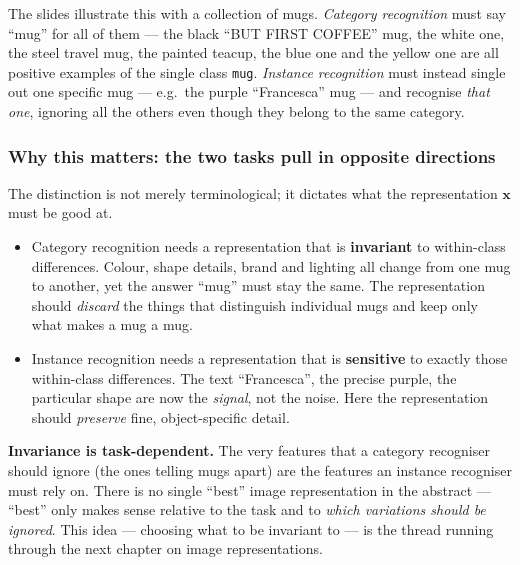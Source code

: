 \documentclass{report}
\newcommand{\xvec}{\mathbf{x}}
\begin{document}
The slides illustrate this with a collection of mugs. \emph{Category
recognition} must say ``mug'' for all of them --- the black ``BUT FIRST
COFFEE'' mug, the white one, the steel travel mug, the painted teacup, the
blue one and the yellow one are all positive examples of the single class
\texttt{mug}. \emph{Instance recognition} must instead single out one specific
mug --- e.g.\ the purple ``Francesca'' mug --- and recognise \emph{that one},
ignoring all the others even though they belong to the same category.

\subsubsection{Why this matters: the two tasks pull in opposite directions}

The distinction is not merely terminological; it dictates what the
representation $\xvec$ must be good at.

\begin{itemize}
\item Category recognition needs a representation that is \textbf{invariant}
to within-class differences. Colour, shape details, brand and lighting all
change from one mug to another, yet the answer ``mug'' must stay the same. The
representation should \emph{discard} the things that distinguish individual
mugs and keep only what makes a mug a mug.

\item Instance recognition needs a representation that is \textbf{sensitive}
to exactly those within-class differences. The text ``Francesca'', the precise
purple, the particular shape are now the \emph{signal}, not the noise. Here the
representation should \emph{preserve} fine, object-specific detail.
\end{itemize}

\begin{keybox}
\textbf{Invariance is task-dependent.} The very features that a category
recogniser should ignore (the ones telling mugs apart) are the features an
instance recogniser must rely on. There is no single ``best'' image
representation in the abstract --- ``best'' only makes sense relative to the
task and to \emph{which variations should be ignored}. This idea --- choosing
what to be invariant to --- is the thread running through the next chapter on
image representations.
\end{keybox}
\end{document}
